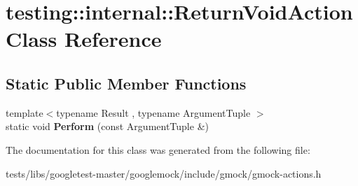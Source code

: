 \hypertarget{classtesting_1_1internal_1_1ReturnVoidAction}{}\section{testing\+:\+:internal\+:\+:Return\+Void\+Action Class Reference}
\label{classtesting_1_1internal_1_1ReturnVoidAction}
\subsection*{Static Public Member Functions}
\begin{DoxyCompactItemize}
\item 
\mbox{\label{classtesting_1_1internal_1_1ReturnVoidAction_ab9ea50ff501225b7510a623d0f0a405e}} 
{\footnotesize template$<$typename Result , typename Argument\+Tuple $>$ }\\static void {\bfseries Perform} (const Argument\+Tuple \&)
\end{DoxyCompactItemize}


The documentation for this class was generated from the following file\+:\begin{DoxyCompactItemize}
\item 
tests/libs/googletest-\/master/googlemock/include/gmock/gmock-\/actions.\+h\end{DoxyCompactItemize}

